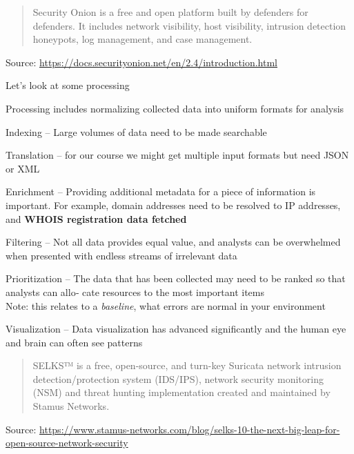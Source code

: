 \documentclass[Screen16to9,17pt]{foils}
\begin{document}


\begin{quote}
Security Onion is a free and open platform built by defenders for defenders. It includes network visibility, host visibility, intrusion detection honeypots, log management, and case management.
\end{quote}
Source:  \url{https://docs.securityonion.net/en/2.4/introduction.html}






Let's look at some processing

\begin{list2}
\item Processing includes normalizing collected data into uniform formats for analysis
\item Indexing -- Large volumes of data need to be made searchable
\item Translation -- for our course we might get multiple input formats but need JSON or XML
\item Enrichment -- Providing additional metadata for a piece of information is important. For example, domain addresses need to be resolved to IP addresses, and {\bf WHOIS registration data fetched}
\item Filtering --
Not all data provides equal value, and analysts can be overwhelmed when presented with endless streams of irrelevant data
\item Prioritization --
The data that has been collected may need to be ranked so that analysts can allo‐
cate resources to the most important items\\
Note: this relates to a \emph{baseline}, what errors are normal in your environment
\item Visualization -- Data visualization has advanced significantly and the human eye and brain can often see patterns
\end{list2}




\begin{quote}
SELKS™ is a free, open-source, and turn-key Suricata network intrusion detection/protection system (IDS/IPS), network security monitoring (NSM) and threat hunting implementation created and maintained by Stamus Networks.
\end{quote}
Source: \url{https://www.stamus-networks.com/blog/selks-10-the-next-big-leap-for-open-source-network-security}
\end{document}
